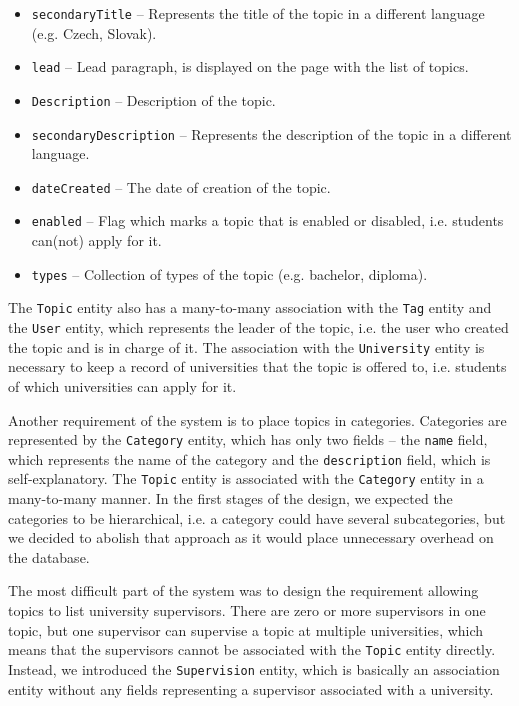 \begin{itemize}
    \item \texttt{secondaryTitle} -- Represents the title of the topic in a different language (e.g. Czech, Slovak).
    \item \texttt{lead} -- Lead paragraph, is displayed on the page with the list of topics.
    \item \texttt{Description} -- Description of the topic.
    \item \texttt{secondaryDescription} -- Represents the description of the topic in a different language.
    \item \texttt{dateCreated} -- The date of creation of the topic.
    \item \texttt{enabled} -- Flag which marks a topic that is enabled or disabled, i.e. students can(not) apply for it.
    \item \texttt{types} -- Collection of types of the topic (e.g. bachelor, diploma).
\end{itemize}

The \texttt{Topic} entity also has a many-to-many association with the \texttt{Tag} entity and the \texttt{User} entity, which represents the leader of the topic, i.e. the user who created the topic and is in charge of it. The association with the \texttt{University} entity is necessary to keep a record of universities that the topic is offered to, i.e. students of which universities can apply for it.

Another requirement of the system is to place topics in categories. Categories are represented by the \texttt{Category} entity, which has only two fields -- the \texttt{name} field, which represents the name of the category and the \texttt{description} field, which is self-explanatory. The \texttt{Topic} entity is associated with the \texttt{Category} entity in a many-to-many manner. In the first stages of the design, we expected the categories to be hierarchical, i.e. a category could have several subcategories, but we decided to abolish that approach as it would place unnecessary overhead on the database.

The most difficult part of the system was to design the requirement allowing topics to list university supervisors. There are zero or more supervisors in one topic, but one supervisor can supervise a topic at multiple universities, which means that the supervisors cannot be associated with the \texttt{Topic} entity directly. Instead, we introduced the \texttt{Supervision} entity, which is basically an association entity without any fields representing a supervisor associated with a university.

